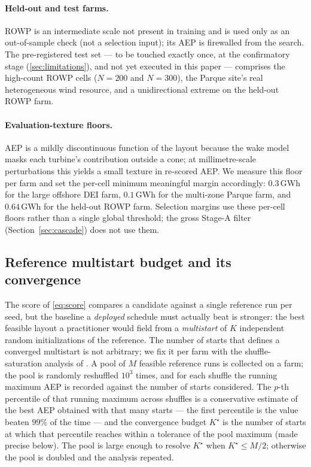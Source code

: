 \documentclass[11pt]{article}
\begin{document}
\paragraph{Held-out and test farms.} ROWP is an intermediate scale not present in
training and is used only as an out-of-sample check (not a selection input); its AEP is firewalled from the
search. The pre-registered test set --- to be touched exactly once, at the confirmatory
stage (\cref{sec:limitations}), and not yet executed in this paper --- comprises the
high-count ROWP cells ($N=200$ and $N=300$), the Parque site's real heterogeneous wind
resource, and a unidirectional extreme on the held-out ROWP farm.

\paragraph{Evaluation-texture floors.} AEP is a mildly discontinuous function of the
layout because the wake model masks each turbine's contribution outside a cone; at
millimetre-scale perturbations this yields a small texture in re-scored AEP. We measure
this floor per farm and set the per-cell minimum meaningful margin accordingly:
$0.3$\,GWh for the large offshore DEI farm, $0.1$\,GWh for the multi-zone Parque farm,
and $0.64$\,GWh for the held-out ROWP farm. Selection margins use these per-cell floors
rather than a single global threshold; the gross Stage-A filter
(Section~\ref{sec:cascade}) does not use them.

\subsection{Reference multistart budget and its convergence}
\label{sec:convergence}
The score of \cref{eq:score} compares a candidate against a single reference run per
seed, but the baseline a \emph{deployed} schedule must actually beat is stronger: the
best feasible layout a practitioner would field from a \emph{multistart} of $K$
independent random initializations of the reference. The number of starts that defines a
converged multistart is not arbitrary; we fix it per farm with the shuffle-saturation
analysis of \citet{quick2026neighbors}. A pool of $M$ feasible reference runs is
collected on a farm; the pool is randomly reshuffled $10^3$ times, and for each shuffle
the running maximum AEP is recorded against the number of starts considered. The $p$-th
percentile of that running maximum across shuffles is a conservative estimate of the best
AEP obtained with that many starts --- the first percentile is the value beaten $99\%$ of
the time --- and the convergence budget $K^\star$ is the number of starts at which that
percentile reaches within a tolerance of the pool maximum (made precise below). The pool
is large enough to resolve $K^\star$ when $K^\star\le M/2$; otherwise the pool is doubled
and the analysis repeated.
\end{document}
